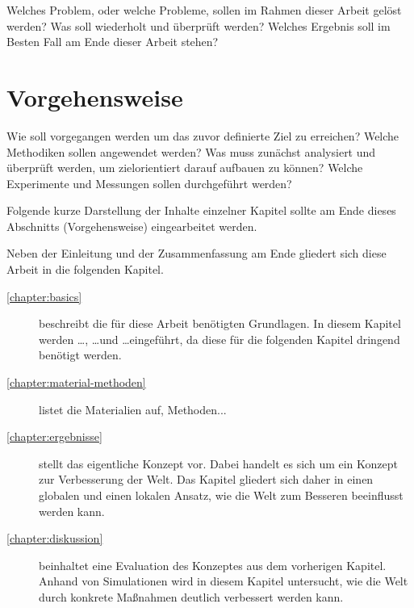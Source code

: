 Welches Problem, oder welche Probleme, sollen im Rahmen dieser Arbeit gelöst werden? Was soll wiederholt und überprüft werden? Welches Ergebnis soll im Besten Fall am Ende dieser Arbeit stehen?

\section{Vorgehensweise}

Wie soll vorgegangen werden um das zuvor definierte Ziel zu erreichen? Welche Methodiken sollen angewendet werden? Was muss zunächst analysiert und überprüft werden, um zielorientiert darauf aufbauen zu können? Welche Experimente und Messungen sollen durchgeführt werden?

Folgende kurze Darstellung der Inhalte einzelner Kapitel sollte am Ende dieses Abschnitts (Vorgehensweise) eingearbeitet werden.

Neben der Einleitung und der Zusammenfassung am Ende gliedert sich diese Arbeit in die folgenden Kapitel.
\begin{description}
  \item[\ref{chapter:basics}] beschreibt die für diese Arbeit benötigten Grundlagen. In diesem Kapitel werden \ldots, \ldots und \ldots eingeführt, da diese für die folgenden Kapitel dringend benötigt werden.
  \item[\ref{chapter:material-methoden}] listet die Materialien auf, Methoden...
  \item[\ref{chapter:ergebnisse}] stellt das eigentliche Konzept vor. Dabei handelt es sich um ein Konzept zur Verbesserung der Welt. Das Kapitel gliedert sich daher in einen globalen und einen lokalen Ansatz, wie die Welt zum Besseren beeinflusst werden kann.
  \item[\ref{chapter:diskussion}] beinhaltet eine Evaluation des Konzeptes aus dem vorherigen Kapitel. Anhand von Simulationen wird in diesem Kapitel untersucht, wie die Welt durch konkrete Maßnahmen deutlich verbessert werden kann.
\end{description}

